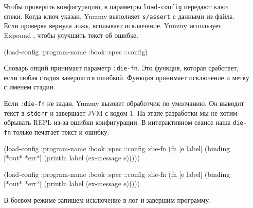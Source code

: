 
Чтобы проверить конфигурацию, в параметры \verb|load-config| передают ключ
спеки. Когда ключ указан, Yummy выполняет \verb|s/assert| с данными из
файла. Если проверка вернула ложь, всплывает исключение. Yummy использует
Expound , чтобы улучшить текст об ошибке.


\begin{english}
  \begin{clojure}
(load-config {:program-name :book
              :spec ::config})
  \end{clojure}
\end{english}


Словарь опций принимает параметр \verb|:die-fn|. Это функция, которая
сработает, если любая стадия завершится ошибкой. Функция принимает исключение
и метку с именем стадии.


Если \verb|:die-fn| не задан, Yummy вызовет обработчик по умолчанию. Он
выводит текст в \verb|stderr| и завершает JVM с кодом 1. На этапе разработки
мы не хотим обрывать REPL из-за ошибки конфигурации. В интерактивном сеансе
наша \verb|die-fn| только печатает текст и ошибку:

\ifnarrow

\begin{english}
  \begin{clojure}
(load-config
 {:program-name :book
  :spec ::config
  :die-fn (fn [e label]
            (binding [*out* *err*]
              (println label
                (ex-message e))))})
  \end{clojure}
\end{english}

\else

\begin{english}
  \begin{clojure}
(load-config
 {:program-name :book
  :spec ::config
  :die-fn (fn [e label]
            (binding [*out* *err*]
              (println label (ex-message e))))})
  \end{clojure}
\end{english}

\fi

В боевом режиме запишем исключение в лог и завершим программу.


